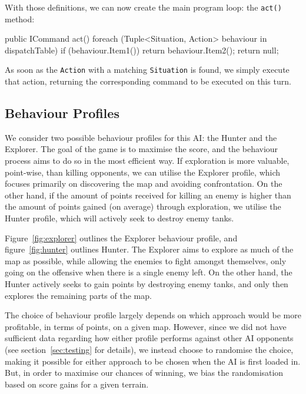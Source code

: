 \documentclass[11pt]{article}
\begin{document}
With those definitions, we can now create the main program loop: the \verb|act()| method:

\begin{code}
public ICommand act()
{
  foreach (Tuple<Situation, Action> behaviour in dispatchTable)
  {
    if (behaviour.Item1())
    {
      return behaviour.Item2();
    }
  }
  return null;
}
\end{code}

As soon as the \verb|Action| with a matching \verb|Situation| is found, we simply execute that action, returning the corresponding command to be executed on this turn.

\subsection{Behaviour Profiles} \label{sec:behaviourProfiles}

We consider two possible behaviour profiles for this AI: the Hunter and the Explorer. The goal of the game is to maximise the score, and the behaviour process aims to do so in the most efficient way. If exploration is more valuable, point-wise, than killing opponents, we can utilise the Explorer profile, which focuses primarily on discovering the map and avoiding confrontation. On the other hand, if the amount of points received for killing an enemy is higher than the amount of points gained (on average) through exploration, we utilise the Hunter profile, which will actively seek to destroy enemy tanks.

Figure~\ref{fig:explorer} outlines the Explorer behaviour profile, and figure~\ref{fig:hunter} outlines Hunter. The Explorer aims to explore as much of the map as possible, while allowing the enemies to fight amongst themselves, only going on the offensive when there is a single enemy left. On the other hand, the Hunter actively seeks to gain points by destroying enemy tanks, and only then explores the remaining parts of the map.

The choice of behaviour profile largely depends on which approach would be more profitable, in terms of points, on a given map. However, since we did not have sufficient data regarding how either profile performs against other AI opponents (see section~\ref{sec:testing} for details), we instead choose to randomise the choice, making it possible for either approach to be chosen when the AI is first loaded in. But, in order to maximise our chances of winning, we bias the randomisation based on score gains for a given terrain.
\end{document}
